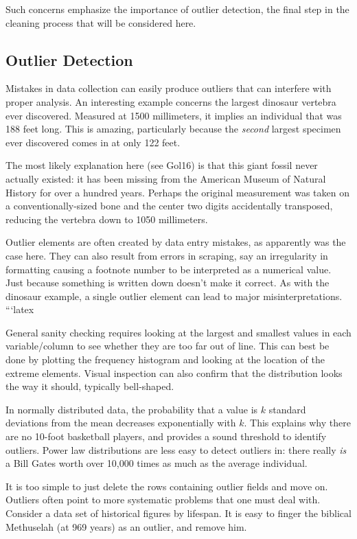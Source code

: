 \documentclass[10pt]{article}
\begin{document}
Such concerns emphasize the importance of outlier detection, the final step in the cleaning process that will be considered here.

\subsection*{Outlier Detection}

Mistakes in data collection can easily produce outliers that can interfere with proper analysis. An interesting example concerns the largest dinosaur vertebra ever discovered. Measured at 1500 millimeters, it implies an individual that was 188 feet long. This is amazing, particularly because the \textit{second} largest specimen ever discovered comes in at only 122 feet.

The most likely explanation here (see Gol16) is that this giant fossil never actually existed: it has been missing from the American Museum of Natural History for over a hundred years. Perhaps the original measurement was taken on a conventionally-sized bone and the center two digits accidentally transposed, reducing the vertebra down to 1050 millimeters.

Outlier elements are often created by data entry mistakes, as apparently was the case here. They can also result from errors in scraping, say an irregularity in formatting causing a footnote number to be interpreted as a numerical value. Just because something is written down doesn't make it correct. As with the dinosaur example, a single outlier element can lead to major misinterpretations.
```latex

General sanity checking requires looking at the largest and smallest values in each variable/column to see whether they are too far out of line. This can best be done by plotting the frequency histogram and looking at the location of the extreme elements. Visual inspection can also confirm that the distribution looks the way it should, typically bell-shaped.

In normally distributed data, the probability that a value is $k$ standard deviations from the mean decreases exponentially with $k$. This explains why there are no 10-foot basketball players, and provides a sound threshold to identify outliers. Power law distributions are less easy to detect outliers in: there really \textit{is} a Bill Gates worth over 10,000 times as much as the average individual.

It is too simple to just delete the rows containing outlier fields and move on. Outliers often point to more systematic problems that one must deal with. Consider a data set of historical figures by lifespan. It is easy to finger the biblical Methuselah (at 969 years) as an outlier, and remove him.
\end{document}
